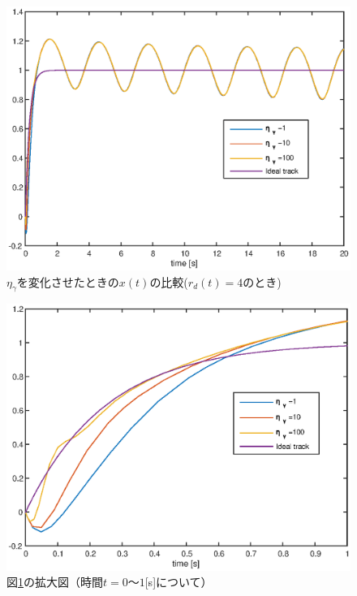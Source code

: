 \documentclass[a4paper,12pt]{jarticle}
\begin{document}
%
%
\begin{figure}[htb]
    \begin{center}
       \includegraphics[width=140mm]{fig/x_rd4_Etag.eps}
	 \caption{$\eta_\gamma$を変化させたときの$x(t)$の比較($r_d(t)=4$のとき)
	 }
        \label{fig:x_rd4etag}
    \end{center}
\end{figure}
%
%
\begin{figure}[htb]
    \begin{center}
	 \includegraphics[width=140mm]{fig/x_rd4_Etag_2.eps}
        \caption{図\ref{fig:x_rd4etag}の拡大図（時間$t=0〜1$[s]について）}
        \label{fig:x_rd4etag2}
    \end{center}
\end{figure}
\end{document}
